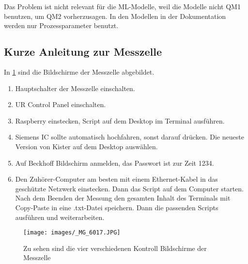 Das Problem ist nicht relevant für die ML-Modelle, weil die Modelle nicht QM1 benutzen, um QM2 vorherzusagen. In den Modellen in der Dokumentation werden nur Prozessparameter benutzt.


\subsection{Kurze Anleitung zur Messzelle}
In \ref{fig:MessCont} sind die Bildschirme der Messzelle abgebildet.
\begin{enumerate}
    \item Hauptschalter der Messzelle einschalten.
    \item UR Control Panel einschalten.
    \item Raspberry einstecken, Script auf dem Desktop im Terminal ausführen.
    \item Siemens IC sollte automatisch hochfahren, sonst darauf drücken. Die neueste Version von Kister auf dem Desktop auswählen.
    \item Auf Beckhoff Bildschirm anmelden, das Passwort ist zur Zeit 1234.
    \item Den Zuhörer-Computer am besten mit einem Ethernet-Kabel in das geschützte Netzwerk einstecken. Dann das Script auf dem Computer starten. Nach dem Beenden der Messung den gesamten Inhalt des Terminals mit Copy-Paste in eine .txt-Datei speichern. Dann die passenden Scripts ausführen und weiterarbeiten.
\end{enumerate}

\begin{figure}%
   
  \texttt{[image: images/\_MG\_6017.JPG]}
  \caption{Zu sehen sind die vier verschiedenen Kontroll Bildschirme der Messzelle}
  \label{fig:MessCont}
\end{figure}
